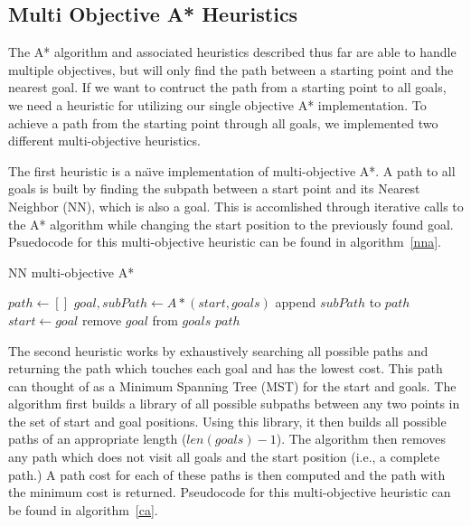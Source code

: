 \documentclass[12pt, conference, compsocconf]{IEEEtran}
\begin{document}
\subsection{Multi Objective A* Heuristics}
The A* algorithm and associated heuristics described thus far are able to
handle multiple objectives, but will only find the path between a starting
point and the nearest goal. If we want to contruct the path from a starting
point to all goals, we need a heuristic for utilizing our single objective A*
implementation.  To achieve a path from the starting point through all goals,
we implemented two different multi-objective heuristics.

The first heuristic is a na\"{\i}ve implementation of multi-objective A*.  A
path to all goals is built by finding the subpath between a start point and its
Nearest Neighbor (NN), which is also a goal.  This is accomlished through
iterative calls to the A* algorithm while changing the start position to the
previously found goal.  Psuedocode for this multi-objective heuristic can be
found in algorithm~\ref{nna}.

\begin{algorithm}
    \caption{NN multi-objective A*}
    \label{nna}
    \begin{algorithmic}[1]
        \State $path\gets []$
        \State $goal, subPath\gets A*(start, goals)$
        \State append $subPath$ to $path$
        \State $start\gets goal$
        \State remove $goal$ from $goals$
        \EndWhile
        \Return $path$
        \EndProcedure
    \end{algorithmic}
\end{algorithm}

The second heuristic works by exhaustively searching all possible paths and
returning the path which touches each goal and has the lowest cost.  This path
can thought of as a Minimum Spanning Tree (MST) for the start and goals.  The
algorithm first builds a library of all possible subpaths between any two
points in the set of start and goal positions.  Using this library, it then
builds all possible paths of an appropriate length ($len(goals)-1$).  The
algorithm then removes any path which does not visit all goals and the start
position (i.e., a complete path.)  A path cost for each of these paths is then
computed and the path with the minimum cost is returned.  Pseudocode for this
multi-objective heuristic can be found in algorithm~\ref{ca}.
\end{document}
